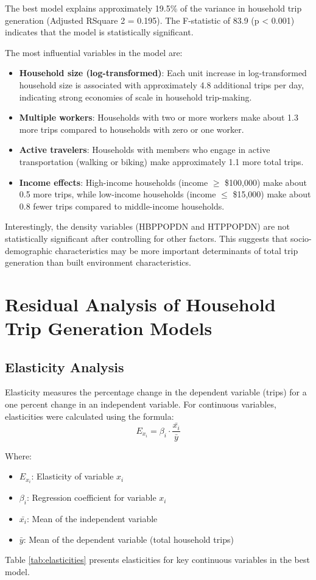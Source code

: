 \documentclass[12pt]{article}
\begin{document}
The best model explains approximately 19.5\% of the variance in household trip generation (Adjusted RSquare
2 = 0.195). The F-statistic of 83.9 (p < 0.001) indicates that the model is statistically significant.

The most influential variables in the model are:
\begin{itemize}
    \item \textbf{Household size (log-transformed)}: Each unit increase in log-transformed household size is associated with approximately 4.8 additional trips per day, indicating strong economies of scale in household trip-making.
    \item \textbf{Multiple workers}: Households with two or more workers make about 1.3 more trips compared to households with zero or one worker.
    \item \textbf{Active travelers}: Households with members who engage in active transportation (walking or biking) make approximately 1.1 more total trips.
    \item \textbf{Income effects}: High-income households (income $\geq$ \$100,000) make about 0.5 more trips, while low-income households (income $\leq$ \$15,000) make about 0.8 fewer trips compared to middle-income households.
\end{itemize}

Interestingly, the density variables (HBPPOPDN and HTPPOPDN) are not statistically significant after controlling for other factors. This suggests that socio-demographic characteristics may be more important determinants of total trip generation than built environment characteristics.

\section{Residual Analysis of Household Trip Generation Models}

\subsection{Elasticity Analysis}
Elasticity measures the percentage change in the dependent variable (trips) for a one percent change in an independent variable. For continuous variables, elasticities were calculated using the formula:
\begin{equation}
E_{x_i} = \beta_i \cdot \frac{\bar{x_i}}{\bar{y}}
\end{equation}

Where:
\begin{itemize} 
    \item $E_{x_i}$: Elasticity of variable $x_i$
    \item $\beta_i$: Regression coefficient for variable $x_i$
    \item $\bar{x_i}$: Mean of the independent variable
    \item $\bar{y}$: Mean of the dependent variable (total household trips)
\end{itemize}
Table \ref{tab:elasticities} presents elasticities for key continuous variables in the best model.
\end{document}
